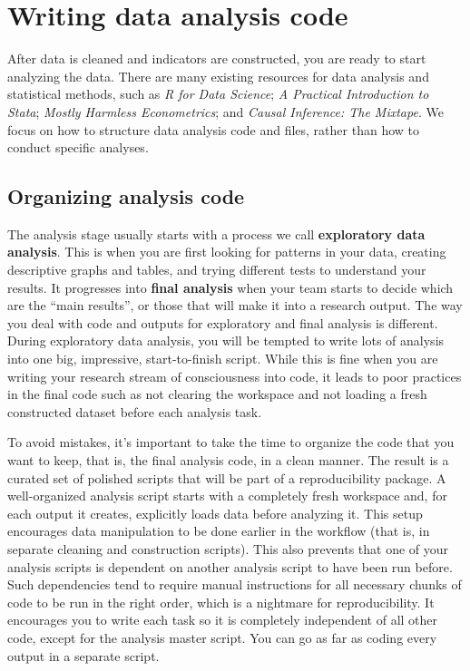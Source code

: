 
\section{Writing data analysis code}

After data is cleaned and indicators are constructed, you are ready to start analyzing the data.
There are many existing resources for data analysis and statistical methods, such as
\textit{R for Data Science};\cite{hadley2017R}
\textit{A Practical Introduction to Stata};\cite{RePEc:gdm:wpaper:9412}
\textit{Mostly Harmless Econometrics};\cite{angrist2008mostly}
and \textit{Causal Inference: The Mixtape}.
We focus on how to structure data analysis code and files, rather than how to conduct specific analyses.

\subsection{Organizing analysis code}

The analysis stage usually starts with a process we call \textbf{exploratory data analysis}.
This is when you are first looking for patterns in your data,
creating descriptive graphs and tables,
and trying different tests to understand your results.
It progresses into \textbf{final analysis} when your team starts to decide which are the ``main results'', or
those that will make it into a research output.
The way you deal with code and outputs for exploratory and final analysis is different.
During exploratory data analysis,
you will be tempted to write lots of analysis into one big, impressive, start-to-finish script.
While this is fine when you are writing your research stream of consciousness into code,
it leads to poor practices in the final code such as not clearing the workspace
and not loading a fresh constructed dataset before each analysis task.

To avoid mistakes, it's important to take the time
to organize the code that you want to keep, that is,
the final analysis code, in a clean manner.
The result is a curated set of polished scripts that
will be part of a reproducibility package.
A well-organized analysis script starts with a completely fresh workspace
and, for each output it creates, explicitly loads data before analyzing it.
This setup encourages data manipulation to be done earlier in the workflow
(that is, in separate cleaning and construction scripts).
This also prevents that one of your analysis scripts 
is dependent on another analysis script to have been run before.
Such dependencies tend to require manual instructions 
for all necessary chunks of code to be run in the right order,
which is a nightmare for reproducibility.
It encourages you to write each task so 
it is completely independent of all other code,
except for the analysis master script.
You can go as far as coding every output in a separate script.

